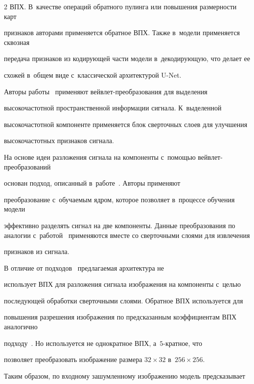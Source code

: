 \begin{multicols}{2}
ВПХ. В~качестве операций обратного пулинга или повышения раз\-мер\-ности карт 


признаков авторами применяется \mbox{обратное} ВПХ. Также в~модели применяется сквозная 


передача признаков из кодирующей части модели в~декодирующую, что делает ее 


схожей в~общем виде с~классической архитектурой U-Net.





Авторы работы~\cite{MDIWT} применяют вейв\-лет-пре\-обра\-зо\-ва\-ния для выделения 


высокочастотной пространственной информации сигнала. К~выделенной 


высокочастотной компоненте применяется блок сверточных слоев для улучшения 


вы\-со\-ко\-час\-тот\-ных признаков сигнала.





На основе идеи разложения сигнала на компоненты с~помощью вейв\-лет-пре\-обра\-зо\-ва\-ний 


основан подход, описанный в~работе~\cite{WINNet}. Авторы \mbox{применяют} 


преобразование с~обучаемым ядром, которое позволяет в~процессе обучения модели 


эффективно разделять сигнал на две компоненты. Данные преобразования по аналогии с~работой~\cite{MDIWT} применяются вместе со сверточными слоями для извлечения 


признаков из сигнала.





В отличие от подходов~\cite{MWCNN, MDIWT, WINNet} пред\-ла\-га\-емая архитектура не 


использует ВПХ для разложения сигнала изображения на компоненты с~\mbox{целью} 


последующей обработки сверточными слоями. Обратное ВПХ используется для 


повышения разрешения изображения по предсказанным коэффициентам ВПХ аналогично 


подходу~\cite{DWB}. Но используется не однократное ВПХ, а~$5$-крат\-ное, что 


позволяет преобразовать изображение размера $32 \times 32$ в~$256 \times 256$. 


Таким образом, по входному зашумленному изображению модель предсказывает 



\end{multicols}
